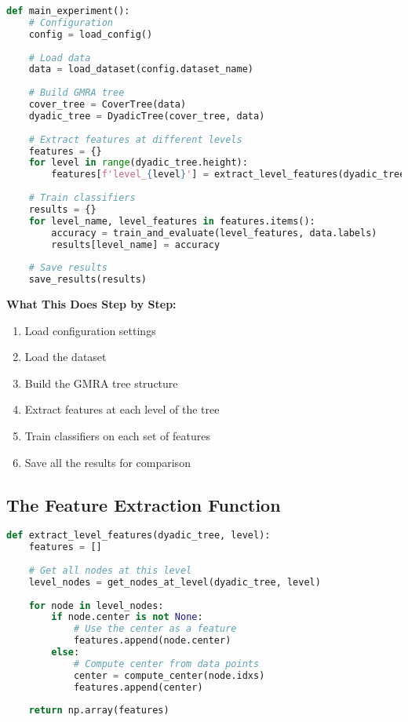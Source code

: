 \documentclass[12pt]{article}
\begin{document}
\begin{lstlisting}[language=Python, basicstyle=\small]
def main_experiment():
    # Configuration
    config = load_config()
    
    # Load data
    data = load_dataset(config.dataset_name)
    
    # Build GMRA tree
    cover_tree = CoverTree(data)
    dyadic_tree = DyadicTree(cover_tree, data)
    
    # Extract features at different levels
    features = {}
    for level in range(dyadic_tree.height):
        features[f'level_{level}'] = extract_level_features(dyadic_tree, level)
    
    # Train classifiers
    results = {}
    for level_name, level_features in features.items():
        accuracy = train_and_evaluate(level_features, data.labels)
        results[level_name] = accuracy
    
    # Save results
    save_results(results)
\end{lstlisting}

\textbf{What This Does Step by Step:}
\begin{enumerate}
    \item Load configuration settings
    \item Load the dataset
    \item Build the GMRA tree structure
    \item Extract features at each level of the tree
    \item Train classifiers on each set of features
    \item Save all the results for comparison
\end{enumerate}

\subsection{The Feature Extraction Function}

\begin{lstlisting}[language=Python, basicstyle=\small]
def extract_level_features(dyadic_tree, level):
    features = []
    
    # Get all nodes at this level
    level_nodes = get_nodes_at_level(dyadic_tree, level)
    
    for node in level_nodes:
        if node.center is not None:
            # Use the center as a feature
            features.append(node.center)
        else:
            # Compute center from data points
            center = compute_center(node.idxs)
            features.append(center)
    
    return np.array(features)
\end{lstlisting}
\end{document}
